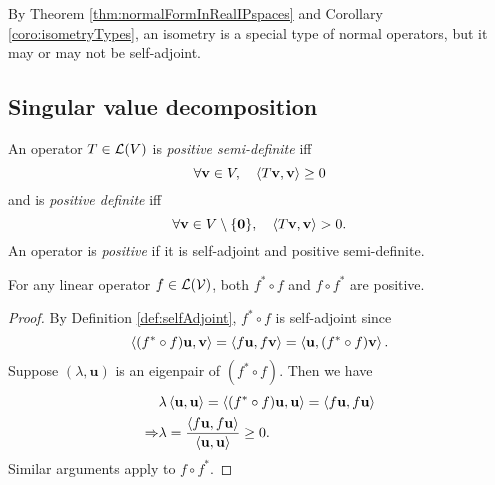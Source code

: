 \begin{rem}
  By Theorem \ref{thm:normalFormInRealIPspaces}
   and Corollary \ref{coro:isometryTypes},
   an isometry is a special type of normal operators, 
   but it may or may not be self-adjoint.
\end{rem}


\subsection{Singular value decomposition}
\label{sec:sing-value-decomp}

\begin{defn}
  \label{def:positiveDefinite}
  An operator $T\in{\cal L}(V)$ is \emph{positive semi-definite}
  iff
  \begin{equation}
    \label{eq:positiveSemiDefinite}
    \forall \mathbf{v}\in V,\quad
    \left\langle T\mathbf{v}, \mathbf{v} \right\rangle \ge 0
  \end{equation}
  and is \emph{positive definite} iff 
  \begin{equation}
    \label{eq:positiveDefinite}
    \forall \mathbf{v}\in V\setminus\{\mathbf{0}\},\quad
    \left\langle T\mathbf{v}, \mathbf{v} \right\rangle > 0.
  \end{equation}
  An operator is \emph{positive}
  if it is self-adjoint
  and positive semi-definite.
\end{defn}

\begin{coro}
  \label{coro:fStarCatf2SelfAdj}
  For any linear operator $f\in {\cal L}({\cal V})$,
  both $f^*\circ f$ and $f\circ f^*$ are positive.
\end{coro}
\begin{proof}
  By Definition \ref{def:selfAdjoint}, %
  $f^*\circ f$ is self-adjoint since
  \begin{displaymath}
    \left\langle (f^*\circ f)\mathbf{u}, \mathbf{v} \right\rangle
    = \left\langle  f\mathbf{u}, f \mathbf{v} \right\rangle
    = \left\langle  \mathbf{u}, (f^*\circ f) \mathbf{v} \right\rangle.
  \end{displaymath}
  Suppose $(\lambda, \mathbf{u})$ is an eigenpair of $(f^*\circ f)$.
  Then we have
  \begin{align*}
    &\lambda\left\langle \mathbf{u}, \mathbf{u} \right\rangle
      = \left\langle (f^*\circ f)\mathbf{u}, \mathbf{u} \right\rangle
      = \left\langle  f\mathbf{u}, f \mathbf{u} \right\rangle
    \\
    \Rightarrow
    & \lambda = \frac{\left\langle  f\mathbf{u}, f
      \mathbf{u} \right\rangle}{\left\langle \mathbf{u}, \mathbf{u} \right\rangle}\ge 0.
  \end{align*}
  Similar arguments apply to $f\circ f^*$. 
\end{proof}

